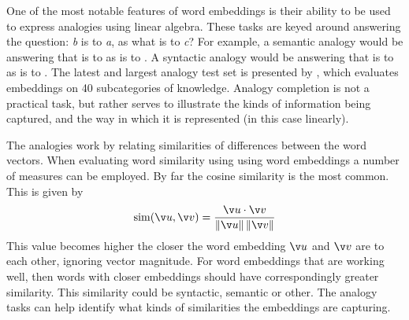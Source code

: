 {


One of the most notable features of  word embeddings is their ability to be used to express analogies using linear algebra.
These tasks are keyed around answering the question: \emph{b} is to \emph{a}, as what is  to \emph{c}?
For example, a semantic analogy would be answering that  is to  as  is to .
A syntactic analogy would be answering that  is to  as  is to .
The latest and largest analogy test set is presented by ,
which evaluates embeddings on 40 subcategories of knowledge.
Analogy completion is not a practical task, but rather serves to illustrate the kinds of information being captured, and the way in which it is represented (in this case linearly).


The analogies work by relating similarities of differences between the word vectors.
When evaluating word similarity using using word embeddings a number of measures can be employed.
By far the cosine similarity is the most common.
This is given by 
\begin{equation}
\mathrm{sim}(\v u, \v v)=\frac{\v u\cdot \v v}{\left\Vert \v u\right\Vert \left\Vert \v v\right\Vert }
\end{equation}
This value becomes higher the closer the word embedding $\v u$ and $\v v$ are to each other, ignoring vector magnitude.
For word embeddings that are working well, then words with closer embeddings should have correspondingly greater similarity.
This similarity could be syntactic, semantic or other.
The analogy tasks can help identify what kinds of similarities the embeddings are capturing.

}
